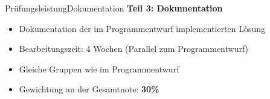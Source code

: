 \begin{frame}{Prüfungsleistung}{Dokumentation}
	\textbf{Teil 3: Dokumentation}
	\begin{itemize}
		\item Dokumentation der im Programmentwurf implementierten Lösung
		\item Bearbeitungszeit: 4 Wochen (Parallel zum Programmentwurf)
		\item Gleiche Gruppen wie im Programmentwurf
		\item Gewichtung an der Gesamtnote: \textbf{30\%}
	\end{itemize}
\end{frame}